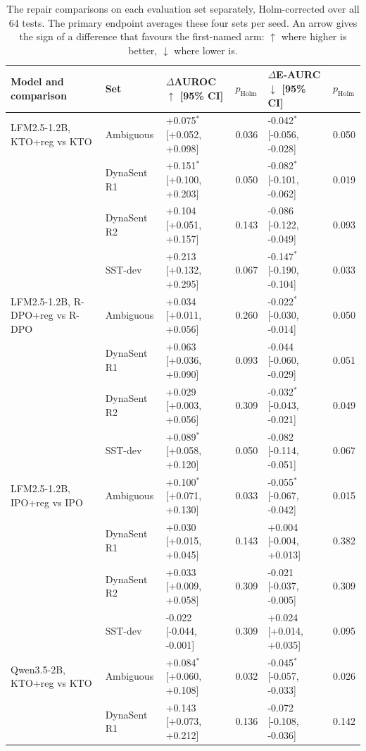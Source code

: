 \begin{table}[t]
\centering
\caption{The repair comparisons on each evaluation set separately, Holm-corrected over all 64 tests. The primary endpoint averages these four sets per seed. An arrow gives the sign of a difference that favours the first-named arm: $\uparrow$ where higher is better, $\downarrow$ where lower is.}
\label{tab:repair-per-set}
\scriptsize
\begin{tabular}{llllll}
\toprule
Model and comparison & Set & $\Delta$AUROC$\uparrow$ [95\% CI] & $p_{\mathrm{Holm}}$ & $\Delta$E-AURC$\downarrow$ [95\% CI] & $p_{\mathrm{Holm}}$ \\
\midrule
LFM2.5-1.2B, KTO+reg vs KTO & Ambiguous & +0.075$^{*}$ [+0.052, +0.098] & 0.036 & -0.042$^{*}$ [-0.056, -0.028] & 0.050 \\
 & DynaSent R1 & +0.151$^{*}$ [+0.100, +0.203] & 0.050 & -0.082$^{*}$ [-0.101, -0.062] & 0.019 \\
 & DynaSent R2 & +0.104 [+0.051, +0.157] & 0.143 & -0.086 [-0.122, -0.049] & 0.093 \\
 & SST-dev & +0.213 [+0.132, +0.295] & 0.067 & -0.147$^{*}$ [-0.190, -0.104] & 0.033 \\
\addlinespace
LFM2.5-1.2B, R-DPO+reg vs R-DPO & Ambiguous & +0.034 [+0.011, +0.056] & 0.260 & -0.022$^{*}$ [-0.030, -0.014] & 0.050 \\
 & DynaSent R1 & +0.063 [+0.036, +0.090] & 0.093 & -0.044 [-0.060, -0.029] & 0.051 \\
 & DynaSent R2 & +0.029 [+0.003, +0.056] & 0.309 & -0.032$^{*}$ [-0.043, -0.021] & 0.049 \\
 & SST-dev & +0.089$^{*}$ [+0.058, +0.120] & 0.050 & -0.082 [-0.114, -0.051] & 0.067 \\
\addlinespace
LFM2.5-1.2B, IPO+reg vs IPO & Ambiguous & +0.100$^{*}$ [+0.071, +0.130] & 0.033 & -0.055$^{*}$ [-0.067, -0.042] & 0.015 \\
 & DynaSent R1 & +0.030 [+0.015, +0.045] & 0.143 & +0.004 [-0.004, +0.013] & 0.382 \\
 & DynaSent R2 & +0.033 [+0.009, +0.058] & 0.309 & -0.021 [-0.037, -0.005] & 0.309 \\
 & SST-dev & -0.022 [-0.044, -0.001] & 0.309 & +0.024 [+0.014, +0.035] & 0.095 \\
\addlinespace
Qwen3.5-2B, KTO+reg vs KTO & Ambiguous & +0.084$^{*}$ [+0.060, +0.108] & 0.032 & -0.045$^{*}$ [-0.057, -0.033] & 0.026 \\
 & DynaSent R1 & +0.143 [+0.073, +0.212] & 0.136 & -0.072 [-0.108, -0.036] & 0.142 \\

\end{tabular}
\end{table}
